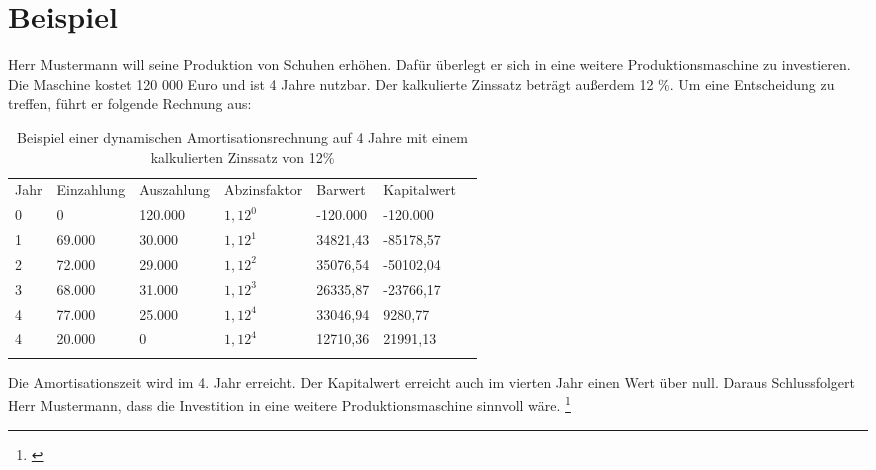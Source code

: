\section{Beispiel}
Herr Mustermann will seine Produktion von Schuhen erhöhen. Dafür überlegt er sich in eine weitere Produktionsmaschine zu investieren. Die Maschine kostet 120 000 Euro und ist 4 Jahre nutzbar. Der kalkulierte Zinssatz beträgt außerdem 12 \%. Um eine Entscheidung zu treffen, führt er folgende Rechnung aus:

\begin{table}[!h]
    \begin{tabular}{lllllll}
        \cline{1-6} \rowcolor{gray}
        Jahr & Einzahlung & Auszahlung & Abzinsfaktor & Barwert  & Kapitalwert \\ \cline{1-6} \rowcolor{white}
        0    & 0          & 120.000    & $1,12^0$     & -120.000 & -120.000    \\ \cline{1-6} \rowcolor{white}
        1    & 69.000     & 30.000     & $1,12^1$     & 34821,43 & -85178,57   \\ \cline{1-6} \rowcolor{white}
        2    & 72.000     & 29.000     & $1,12^2$     & 35076,54 & -50102,04   \\ \cline{1-6} \rowcolor{white}
        3    & 68.000     & 31.000     & $1,12^3$     & 26335,87 & -23766,17   \\ \cline{1-6} \rowcolor{white}
        4    & 77.000     & 25.000     & $1,12^4$     & 33046,94 & 9280,77     \\ \cline{1-6} \rowcolor{white}
        4    & 20.000     & 0          & $1,12^4$     & 12710,36 & 21991,13    \\ \cline{1-6} \rowcolor{white}
    \end{tabular}
    \caption{Beispiel einer dynamischen Amortisationsrechnung auf 4 Jahre mit einem kalkulierten Zinssatz von 12\%}\label{tb:dynamische Amortisationsrechnung}
\end{table}
\bigskip
\noindent
Die Amortisationszeit wird im 4. Jahr erreicht. Der Kapitalwert erreicht auch im vierten Jahr einen Wert über null. Daraus Schlussfolgert Herr Mustermann, dass die Investition in eine weitere Produktionsmaschine sinnvoll wäre.
\footnote{\cite{payoff}}

